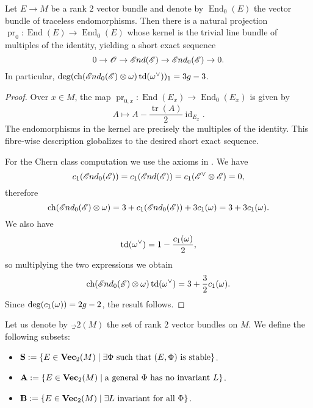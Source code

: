 \documentclass[A4paper, 12pt, british, reqno]{amsart}
\DeclareMathOperator{\End}{End}
\DeclareMathOperator{\id}{id}
\DeclareMathOperator{\tr}{tr}
\DeclareMathOperator{\pr}{pr}
\DeclareMathOperator{\ch}{ch}
\DeclareMathOperator{\td}{td}
\newcommand{\ot}{\otimes}
\newcommand{\dual}{^{\vee}}
\begin{document}
\begin{lm}\label{lm:traceless}
    Let $E\to M$ be a rank $2$ vector bundle and denote by $\End_{0}(E)$ the vector bundle of traceless endomorphisms.
    Then there is a natural projection $\pr_{0}\colon \End(E)\to \End_{0}(E)$ whose kernel is the trivial line bundle of multiples of the identity, yielding a short exact sequence
    \[ 0\to \mathscr{O}\to \mathscr{E}\hspace{-0.2mm} nd(\mathscr{E})\to \mathscr{E}\hspace{-0.2mm} nd_{0}(\mathscr{E})\to 0. \]
    In particular, $\deg(\ch(\sEnd_{0}(\E)\ot \w)\td(\w\dual))_{1}=3g-3$.
    \begin{proof}
	Over $x\in M$, the map $\pr_{0,x}\colon \End(E_{x})\to \End_{0}(E_{x})$ is given by
	\[ A\mapsto A-\frac{\tr(A)}{2}\id_{E_{x}}. \]
	The endomorphisms in the kernel are precisely the multiples of the identity.
	This fibre-wise description globalizes to the desired short exact sequence.

	For the Chern class computation we use the axioms in \cite[Appendix A]{har77}.
	We have
	\[ c_{1}(\sEnd_{0}(\E))=c_{1}(\sEnd(\E))=c_{1}(\E\dual\ot\E)=0, \]
	therefore
	\[ \ch(\sEnd_{0}(\E)\ot \w)=3+c_{1}(\sEnd_{0}(\E))+3c_{1}(\w)=3+3c_{1}(\w). \]
	We also have
	\[ \td(\w\dual)=1-\frac{c_{1}(\w)}{2}, \]
	so multiplying the two expressions we obtain
	\[ \ch(\sEnd_{0}(\E)\ot \w)\td(\w\dual)=3+\frac{3}{2}c_{1}(\w). \]
	Since $\deg(c_{1}(\omega))=2g-2$, the result follows.
    \end{proof}
\end{lm}

\begin{unota}
    Let us denote by $\Vec_{2}(M)$ the set of rank $2$ vector bundles on $M$.
    We define the following subsets:
    \begin{itemize}
	\item $\mathbf{S}:=\{ E\in \mathbf{Vec}_{2}(M)\mid \exists \Phi \text{ such that }(E,\Phi)\text{ is stable}\}$.
	\item $\mathbf{A}:=\{ E\in \mathbf{Vec}_{2}(M)\mid \text{a general }\Phi\text{ has no invariant }L \}$.
	\item $\mathbf{B}:=\{ E\in \mathbf{Vec}_{2}(M)\mid \exists L\text{ invariant for all }\Phi\}$.
    \end{itemize}
\end{unota}
\end{document}
